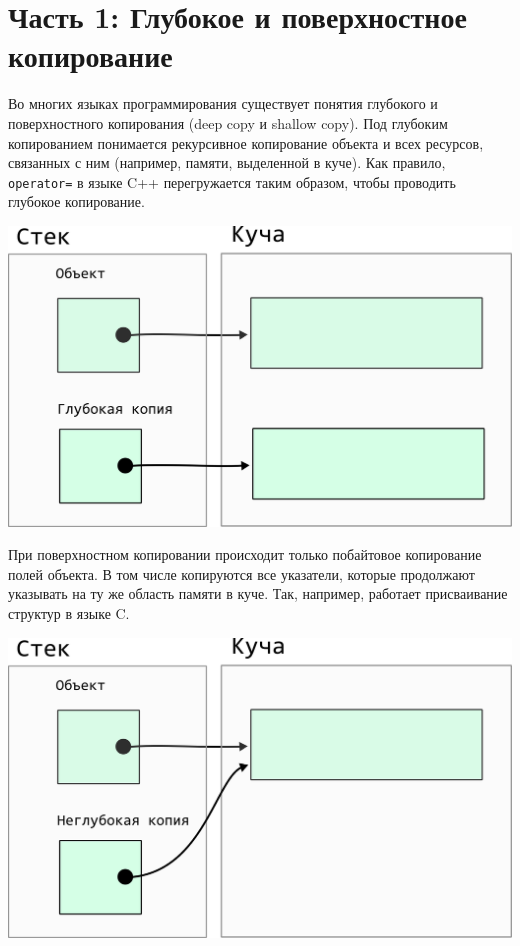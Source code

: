 \documentclass{article}
\begin{document}
\section*{Часть 1: Глубокое и поверхностное копирование}
Во многих языках программирования существует понятия глубокого и поверхностного копирования (deep copy и shallow copy). Под глубоким копированием понимается рекурсивное копирование объекта и всех ресурсов, связанных с ним (например, памяти, выделенной в куче). Как правило, \texttt{operator=} в языке C++ перегружается таким образом, чтобы проводить глубокое копирование.
\begin{center}
\includegraphics[scale=0.9]{../images/deep.png}
\end{center}

При поверхностном копировании происходит только побайтовое копирование полей объекта. В том числе копируются все указатели, которые продолжают указывать на ту же область памяти в куче. Так, например, работает присваивание структур в языке C.

\begin{center}
\includegraphics[scale=0.9]{../images/shallow.png}
\end{center}
\end{document}
